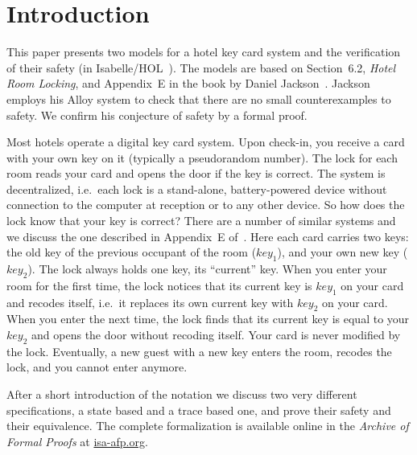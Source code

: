 \section{Introduction}

This paper presents two models for a hotel key card system and the
verification of their safety (in Isabelle/HOL~\cite{LNCS2283}). The
models are based on Section~6.2, \emph{Hotel Room Locking}, and
Appendix~E in the book by Daniel Jackson~\cite{Jackson06}. Jackson
employs his Alloy system to check that there are no small
counterexamples to safety. We confirm his conjecture of safety by a
formal proof.

Most hotels operate a digital key card system. Upon check-in, you
receive a card with your own key on it (typically a pseudorandom
number). The lock for each room reads your card and opens the door if
the key is correct. The system is decentralized,
i.e.\ each lock is a stand-alone, battery-powered device without
connection to the computer at reception or to any other device. So
how does the lock know that your key is correct? There are a number of
similar systems and we discuss the one described in Appendix~E
of~\cite{Jackson06}. Here each card carries two keys: the old key of
the previous occupant of the room ($key_1$), and your own new key
($key_2$). The lock always holds one key, its ``current'' key. When
you enter your room for the first time, the lock notices that its
current key is $key_1$ on your card and recodes itself, i.e.\ it replaces
its own current key with $key_2$ on your card. When you enter the next
time, the lock finds that its current key is equal to your $key_2$ and
opens the door without recoding itself. Your card is never modified by
the lock. Eventually, a new guest with a new key enters the room,
recodes the lock, and you cannot enter anymore.

After a short introduction of the notation we discuss two very
different specifications, a state based and a trace based one, and
prove their safety and their equivalence. The complete formalization
is available online in the \emph{Archive of Formal Proofs} at
\url{isa-afp.org}.

